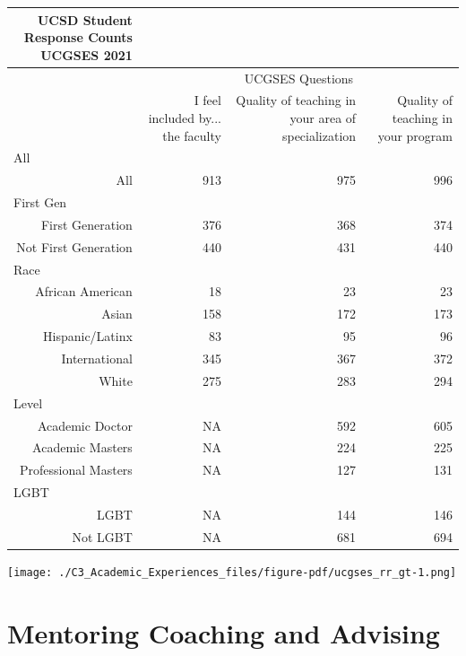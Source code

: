 \documentclass[
  letterpaper,
  DIV=11,
  numbers=noendperiod]{scrreprt}
\begin{document}
\captionsetup[table]{labelformat=empty,skip=1pt}
\begin{longtable}{r|rrr}
\caption*{
{\large UCSD Student Response Counts} \\ 
{\small UCGSES 2021}
} \\ 
\toprule
\multicolumn{1}{l}{} & \multicolumn{3}{c}{UCGSES Questions} \\ 
\cmidrule(lr){2-4}
\multicolumn{1}{l}{} & I feel included by... the faculty & Quality of teaching in your area of specialization & Quality of teaching in your program \\ 
\midrule
\multicolumn{1}{l}{All} \\ 
\midrule
All & 913 & 975 & 996 \\ 
\midrule
\multicolumn{1}{l}{First Gen} \\ 
\midrule
First Generation & 376 & 368 & 374 \\ 
Not First Generation & 440 & 431 & 440 \\ 
\midrule
\multicolumn{1}{l}{Race} \\ 
\midrule
African American & 18 & 23 & 23 \\ 
Asian & 158 & 172 & 173 \\ 
Hispanic/Latinx & 83 & 95 & 96 \\ 
International & 345 & 367 & 372 \\ 
White & 275 & 283 & 294 \\ 
\midrule
\multicolumn{1}{l}{Level} \\ 
\midrule
Academic Doctor & NA & 592 & 605 \\ 
Academic Masters & NA & 224 & 225 \\ 
Professional Masters & NA & 127 & 131 \\ 
\midrule
\multicolumn{1}{l}{LGBT} \\ 
\midrule
LGBT & NA & 144 & 146 \\ 
Not LGBT & NA & 681 & 694 \\ 
\bottomrule
\end{longtable}

\texttt{[image: ./C3\_Academic\_Experiences\_files/figure-pdf/ucgses\_rr\_gt-1.png]}


\hypertarget{mentoring-coaching-and-advising}{%
\chapter{Mentoring Coaching and
Advising}\label{mentoring-coaching-and-advising}}
\end{document}
